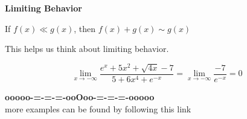 \documentclass{ximera}
\begin{document}
\begin{idea} \textbf{\textcolor{blue!55!black}{Limiting Behavior}}



If $f(x) \ll g(x)$, then $f(x) + g(x) \sim g(x)$



\end{idea}


This helps us think about limiting behavior.



\begin{example}


\[
\lim\limits_{x \to -\infty} \frac{e^{x} + 5x^2 + \sqrt{4x} - 7}{5 + 6x^4 + e^{-x}} = \lim\limits_{x \to -\infty} \frac{-7}{e^{-x}} = 0
\]



\end{example}



















\begin{center}
\textbf{\textcolor{green!50!black}{ooooo-=-=-=-ooOoo-=-=-=-ooooo}} \\

more examples can be found by following this link\\ 

\end{center}
\end{document}
